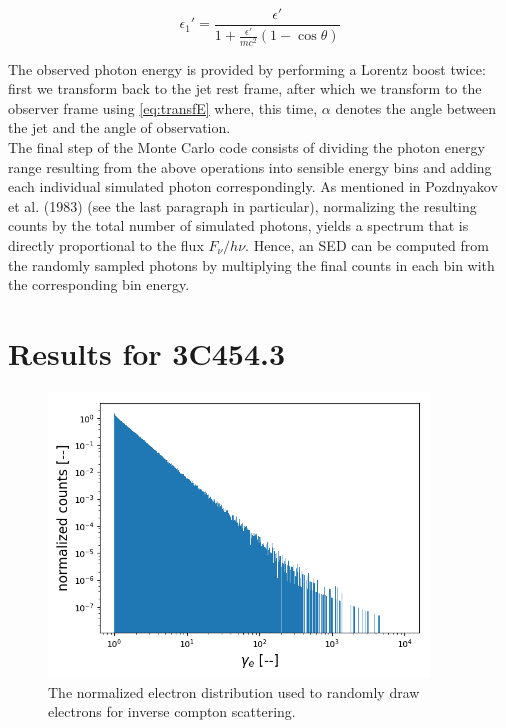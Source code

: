 \documentclass{article}
\begin{document}
            \begin{equation}
                \epsilon_1' = \frac{\epsilon'}{1+\frac{\epsilon'}{mc^2}(1-\cos\theta)}
            \end{equation}
         
        The observed photon energy is provided by performing a Lorentz boost twice: first we transform back to the jet rest frame, after which we transform to the observer frame using \ref{eq:transfE} where, this time, $\alpha$ denotes the angle between the jet and the angle of observation. \\
        The final step of the Monte Carlo code consists of dividing the photon energy range resulting from the above operations into sensible energy bins and adding each individual simulated photon correspondingly. As mentioned in Pozdnyakov et al. (1983) \cite{Pozdnyakov1983} (see the last paragraph in particular), normalizing the resulting counts by the total number of simulated photons, yields a spectrum that is directly proportional to the flux $F_\nu / h\nu$. Hence, an SED can be computed from the randomly sampled photons by multiplying the final counts in each bin with the corresponding bin energy. 


 


\section{Results for 3C454.3}

    \begin{figure}[ht]
        \centering
        \includegraphics[width=0.9\textwidth]{3C454_3_electrondist.png}
        \caption{The normalized electron distribution used to randomly draw electrons for inverse compton scattering.}
    \end{figure}
    \label{fig:electron_distr}
\end{document}
